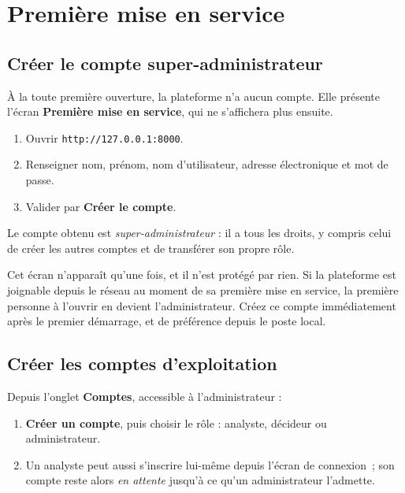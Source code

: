 \chapter{Première mise en service}
\minitoc

\section{Créer le compte super-administrateur}

À la toute première ouverture, la plateforme n'a aucun compte. Elle présente
l'écran \textbf{Première mise en service}, qui ne s'affichera plus ensuite.

\begin{enumerate}[leftmargin=*]
  \item Ouvrir \texttt{http://127.0.0.1:8000}.
  \item Renseigner nom, prénom, nom d'utilisateur, adresse électronique et mot
        de passe.
  \item Valider par \textbf{Créer le compte}.
\end{enumerate}

Le compte obtenu est \emph{super-administrateur} : il a tous les droits, y
compris celui de créer les autres comptes et de transférer son propre rôle.

\begin{tcolorbox}[colback=orange!5!white, colframe=orange!70!black,
  title=\textbf{Attention}, fonttitle=\bfseries, boxrule=0.6pt]
Cet écran n'apparaît qu'une fois, et il n'est protégé par rien. Si la
plateforme est joignable depuis le réseau au moment de sa première mise en
service, la première personne à l'ouvrir en devient l'administrateur. Créez ce
compte immédiatement après le premier démarrage, et de préférence depuis le
poste local.
\end{tcolorbox}

\section{Créer les comptes d'exploitation}

Depuis l'onglet \textbf{Comptes}, accessible à l'administrateur :

\begin{enumerate}[leftmargin=*]
  \item \textbf{Créer un compte}, puis choisir le rôle : analyste, décideur ou
        administrateur.
  \item Un analyste peut aussi s'inscrire lui-même depuis l'écran de connexion~;
        son compte reste alors \emph{en attente} jusqu'à ce qu'un
        administrateur l'admette.
\end{enumerate}

